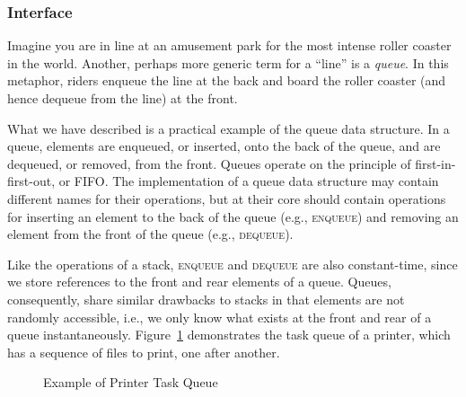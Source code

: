 \subsubsection*{ Interface}
Imagine you are in line at an amusement park for the most intense roller coaster in the world. 
Another, perhaps more generic term for a ``line'' is a \emph{queue}.
In this metaphor, riders enqueue the line at the back and board the roller coaster (and hence dequeue from the line) at the front. 

What we have described is a practical example of the queue data structure. 
In a queue, elements are enqueued, or inserted, onto the back of the queue, and are dequeued, or removed, from the front. 
Queues operate on the principle of first-in-first-out, or FIFO. 
The implementation of a queue data structure may contain different names for their operations, but at their core should contain operations for inserting an element to the back of the queue (e.g., \textsc{enqueue}) and removing an element from the front of the queue (e.g., \textsc{dequeue}). 

Like the operations of a stack, \textsc{enqueue} and \textsc{dequeue} are also constant-time, since we store references to the front and rear elements of a queue. 
Queues, consequently, share similar drawbacks to stacks in that elements are not randomly accessible, i.e., we only know what exists at the front and rear of a queue instantaneously. 
Figure~\ref{fig:printerqueue} demonstrates the task queue of a printer, which has a sequence of files to print, one after another.

\begin{figure}[ht]
\begin{center}
\end{center}
\caption{Example of Printer Task Queue}
\label{fig:printerqueue}
\end{figure}

